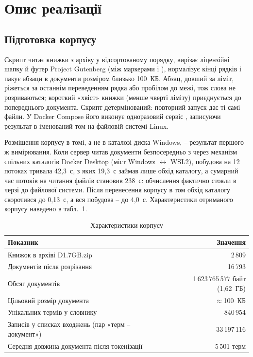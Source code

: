 \section{Опис реалізації}

\subsection{Підготовка корпусу}

Скрипт  читає книжки з архіву у відсортованому порядку,
вирізає ліцензійні шапку й футер Project Gutenberg (між маркерами
 і ), нормалізує кінці рядків і пакує абзаци в
документи розміром близько 100~КБ. Абзац, довший за ліміт, ріжеться за останнім переведенням
рядка або пробілом до межі, тож слова не розриваються; короткий «хвіст» книжки (менше чверті
ліміту) приєднується до попереднього документа. Скрипт детермінований: повторний запуск дає
ті самі файли. У Docker Compose його виконує одноразовий сервіс , записуючи
результат в іменований том  на файловій системі Linux.

Розміщення корпусу в томі, а не в каталозі диска Windows, -- результат першого ж вимірювання.
Коли сервер читав документи безпосередньо з  через механізм спільних
каталогів Docker Desktop (міст Windows $\leftrightarrow$ WSL2), побудова на 12 потоках
тривала 42,3~с, з яких 19,3~с займав лише обхід каталогу, а сумарний час потоків на читання
файлів становив 238~с: обчислення фактично стояли в черзі до файлової системи. Після
перенесення корпусу в том обхід каталогу скоротився до 0,13~с, а вся побудова -- до 4,0~с.
Характеристики отриманого корпусу наведено в табл.~\ref{tab:corpus}.

\begin{table}[H]
\caption{Характеристики корпусу}\label{tab:corpus}
\centering\begin{tabularx}{\textwidth}{Xr}
\toprule
Показник & Значення\\
\midrule
Книжок в архіві D1.7GB.zip & 2\,809\\
Документів після розрізання & 16\,793\\
Обсяг документів & 1\,623\,765\,577 байт (1,62~ГБ)\\
Цільовий розмір документа & $\approx$100~КБ\\
Унікальних термів у словнику & 840\,954\\
Записів у списках входжень (пар «терм -- документ») & 33\,197\,116\\
Середня довжина документа після токенізації & 5\,501 терм\\
\bottomrule
\end{tabularx}
\end{table}

